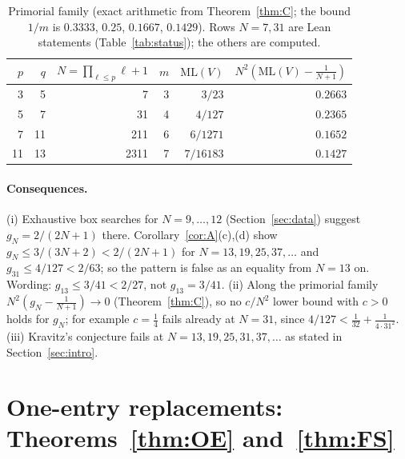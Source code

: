 \documentclass[11pt]{article}
\theoremstyle{definition}
\theoremstyle{remark}
\newcommand{\ML}{\mathrm{ML}}
\begin{document}
\begin{table}[ht]
\centering
\small
\begin{tabular}{r r r r r r}
\toprule
$p$ & $q$ & $N=\prod_{\ell\le p}\ell+1$ & $m$ & $\ML(V)$ & $N^2(\ML(V)-\tfrac1{N+1})$ \\
\midrule
3 & 5 & 7 & 3 & $3/23$ & $0.2663$ \\
5 & 7 & 31 & 4 & $4/127$ & $0.2365$ \\
7 & 11 & 211 & 6 & $6/1271$ & $0.1652$ \\
11 & 13 & 2311 & 7 & $7/16183$ & $0.1427$ \\
\bottomrule
\end{tabular}
\caption{Primorial family (exact arithmetic from Theorem~\ref{thm:C}; the bound $1/m$ is $0.3333$, $0.25$, $0.1667$, $0.1429$). Rows $N=7,31$ are Lean statements (Table~\ref{tab:status}); the others are computed.}
\label{tab:primorial}
\end{table}

\paragraph{Consequences.}
(i) Exhaustive box searches for $N=9,\dots,12$ (Section~\ref{sec:data}) suggest $g_N=2/(2N+1)$ there. Corollary~\ref{cor:A}(c),(d) show $g_N\le3/(3N+2)<2/(2N+1)$ for $N=13,19,25,37,\dots$ and $g_{31}\le4/127<2/63$; so the pattern is false as an equality from $N=13$ on. Wording: $g_{13}\le3/41<2/27$, not $g_{13}=3/41$. (ii) Along the primorial family $N^2(g_N-\frac1{N+1})\to0$ (Theorem~\ref{thm:C}), so no $c/N^2$ lower bound with $c>0$ holds for $g_N$; for example $c=\frac14$ fails already at $N=31$, since $4/127<\frac1{32}+\frac1{4\cdot31^2}$. (iii) Kravitz's conjecture fails at $N=13,19,25,31,37,\dots$ as stated in Section~\ref{sec:intro}.

\section{One-entry replacements: Theorems~\ref{thm:OE} and~\ref{thm:FS}}\label{sec:OE}
\end{document}
